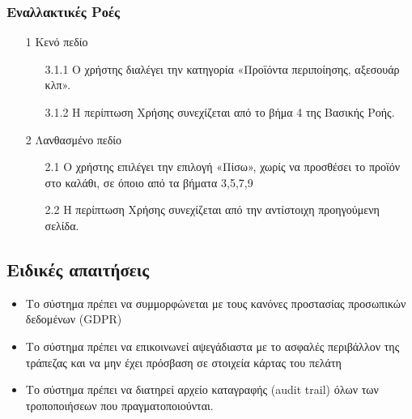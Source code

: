 \documentclass[12pt,a4paper,twoside]{book}
\begin{document}
\subsubsection{Εναλλακτικές Ροές}
\begin{enumerate}
  \item[1 ] Κενό πεδίο  %
        \begin{enumerate}
          \item[3.1.1 ] Ο χρήστης διαλέγει την κατηγορία «Προϊόντα περιποίησης, αξεσουάρ κλπ». %
          \item[3.1.2 ] Η περίπτωση Χρήσης συνεχίζεται από το βήμα 4 της Βασικής Ροής. %
        \end{enumerate}
  \item[2 ] Λανθασμένο πεδίο %
        \begin{enumerate}
          \item[2.1 ] Ο χρήστης επιλέγει την επιλογή «Πίσω», χωρίς να προσθέσει το προϊόν στο καλάθι, σε όποιο από τα βήματα 3,5,7,9 %
          \item[2.2 ] Η περίπτωση Χρήσης συνεχίζεται από την αντίστοιχη προηγούμενη σελίδα. %
        \end{enumerate}
\end{enumerate}

\subsection{Ειδικές απαιτήσεις} %
\begin{itemize}
  \item Το σύστημα πρέπει να συμμορφώνεται με τους κανόνες προστασίας προσωπικών δεδομένων (GDPR)  %
  \item Το σύστημα πρέπει να επικοινωνεί αψεγάδιαστα με το ασφαλές περιβάλλον της τράπεζας και να μην έχει πρόσβαση σε στοιχεία κάρτας του πελάτη   %
  \item Το σύστημα πρέπει να διατηρεί αρχείο καταγραφής (audit trail) όλων των τροποποιήσεων που πραγματοποιούνται. %
\end{itemize}
\end{document}
